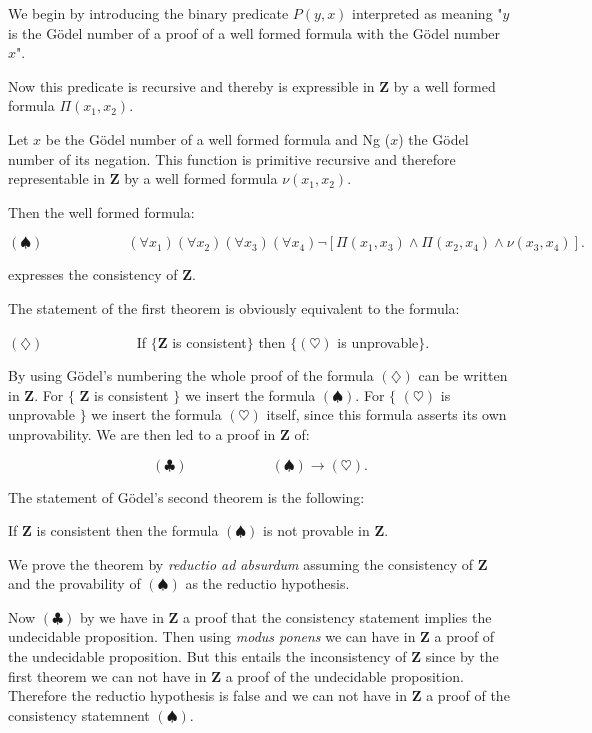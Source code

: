 \documentclass[12pt]{article}
\begin{document}
We begin by introducing the binary predicate $P (y, x)$ interpreted as meaning "$y$ is the G\"{o}del number of a proof of a well formed formula with the G\"{o}del number $x$".

Now this predicate is recursive and thereby is expressible in $\textbf{Z}$ by a well formed formula $\Pi (x_1, x_2)$.

Let $x$ be the G\"{o}del number of a well formed formula and Ng ($x$) the G\"{o}del number of its negation. This function is primitive recursive and therefore representable in $\textbf{Z}$ by a well formed formula $\nu (x_1, x_2)$.

Then the well formed formula:

$$(\spadesuit) \hspace{6em} (\forall x_1) (\forall x_2) (\forall x_3) (\forall x_4) \neg [\Pi (x_1, x_3) \wedge \Pi (x_2, x_4) \wedge \nu (x_3, x_4)].$$

expresses the consistency of $\textbf{Z}$.

The statement of the first theorem is obviously equivalent to the formula:

\begin{center}
$(\diamondsuit)$ $\hspace{6em}$ If $\{$$\textbf{Z}$ is consistent$\}$ then $\{$$(\heartsuit)$ is unprovable$\}$.
\end{center}

By using G\"{o}del's numbering the whole proof of the formula $(\diamondsuit)$ can be written in $\textbf{Z}$. For $\{$ $\textbf{Z}$ is consistent $\}$ we insert the formula $(\spadesuit)$. For $\{$ $(\heartsuit)$ is unprovable $\}$ we insert the formula $(\heartsuit)$ itself, since this formula asserts its own unprovability. We are then led to a proof in $\textbf{Z}$ of:
 
$$(\clubsuit) \hspace{6em} (\spadesuit) \rightarrow (\heartsuit).$$

The statement of G\"{o}del's second theorem is the following:

\begin{center}
If $\textbf{Z}$ is consistent then the formula $(\spadesuit)$ is not provable in $\textbf{Z}$.
\end{center}

We prove the theorem by \emph{reductio ad absurdum} assuming the consistency of $\textbf{Z}$ and the provability of $(\spadesuit)$ as the reductio hypothesis.

Now $(\clubsuit)$ by we have in $\textbf{Z}$ a proof that the consistency statement implies the undecidable proposition. Then using \emph{modus ponens} we can have in $\textbf{Z}$ a proof of the undecidable proposition. But this entails the inconsistency of $\textbf{Z}$ since by the first theorem we can not have in $\textbf{Z}$ a proof of the undecidable proposition. Therefore the reductio hypothesis is false and we can not have in $\textbf{Z}$ a proof of the consistency statemnent $(\spadesuit)$.  
\end{document}
